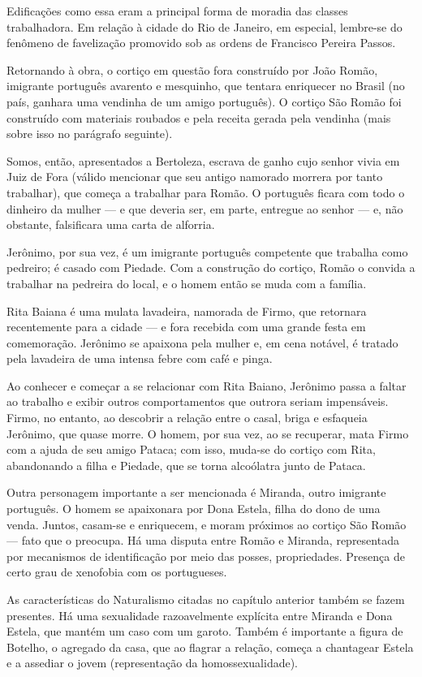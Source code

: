 Edificações como essa eram a principal forma de moradia das classes trabalhadora. Em relação à cidade do Rio de Janeiro, em especial, lembre-se do fenômeno de favelização promovido sob as ordens de Francisco Pereira Passos.

Retornando à obra, o cortiço em questão fora construído por João Romão, imigrante português avarento e mesquinho, que tentara enriquecer no Brasil (no país, ganhara uma vendinha de um amigo português). O cortiço São Romão foi construído com materiais roubados e pela receita gerada pela vendinha (mais sobre isso no parágrafo seguinte).

Somos, então, apresentados a Bertoleza, escrava de ganho cujo senhor vivia em Juiz de Fora (válido mencionar que seu antigo namorado morrera por tanto trabalhar), que começa a trabalhar para Romão. O português ficara com todo o dinheiro da mulher — e que deveria ser, em parte, entregue ao senhor — e, não obstante, falsificara uma carta de alforria.

Jerônimo, por sua vez, é um imigrante português competente que trabalha como pedreiro; é casado com Piedade. Com a construção do cortiço, Romão o convida a trabalhar na pedreira do local, e o homem então se muda com a família.

Rita Baiana é uma mulata lavadeira, namorada de Firmo, que retornara recentemente para a cidade — e fora recebida com uma grande festa em comemoração. Jerônimo se apaixona pela mulher e, em cena notável, é tratado pela lavadeira de uma intensa febre com café e pinga.

Ao conhecer e começar a se relacionar com Rita Baiano, Jerônimo passa a faltar ao trabalho e exibir outros comportamentos que outrora seriam impensáveis. Firmo, no entanto, ao descobrir a relação entre o casal, briga e esfaqueia Jerônimo, que quase morre. O homem, por sua vez, ao se recuperar, mata Firmo com a ajuda de seu amigo Pataca; com isso, muda-se do cortiço com Rita, abandonando a filha e Piedade, que se torna alcoólatra junto de Pataca.

Outra personagem importante a ser mencionada é Miranda, outro imigrante português. O homem se apaixonara por Dona Estela, filha do dono de uma venda. Juntos, casam-se e enriquecem, e moram próximos ao cortiço São Romão — fato que o preocupa. Há uma disputa entre Romão e Miranda, representada por mecanismos de identificação por meio das posses, propriedades. Presença de certo grau de xenofobia com os portugueses.

As características do Naturalismo citadas no capítulo anterior também se fazem presentes. Há uma sexualidade razoavelmente explícita entre Miranda e Dona Estela, que mantém um caso com um garoto. Também é importante a figura de Botelho, o agregado da casa, que ao flagrar a relação, começa a chantagear Estela e a assediar o jovem (representação da homossexualidade).

